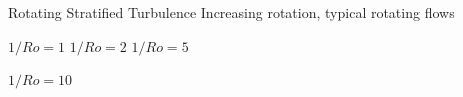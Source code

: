 \documentclass[aspecttatio=169]{beamer}
\begin{document}
\begin{frame}{Rotating Stratified Turbulence}
    Increasing rotation, typical rotating flows



        \centering
        $1/Ro = 1$
    \emp
        \centering
        $1/Ro = 2$
        \vspace{2pt}
    \emp
    \hspace{1pt}
        \centering
        $1/Ro = 5$
        \vspace{2pt}
        
    \emp
        \centering
        $1/Ro = 10$
        \vspace{2pt}
        
    \emp
\end{frame}
\end{document}
